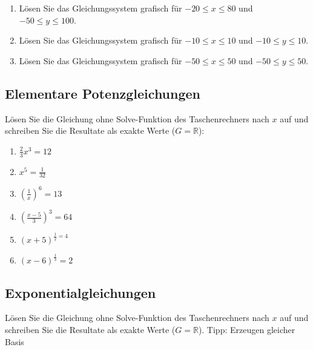   \begin{enumerate}
  \item Lösen Sie das Gleichungssystem grafisch für
    $-20 \leq x \leq 80$ und $-50 \leq y \leq 100$.


    \item Lösen Sie das Gleichungssystem grafisch für
      $-10 \leq x \leq 10$ und $-10 \leq y \leq 10$.


          \item Lösen Sie das Gleichungssystem grafisch für
      $-50 \leq x \leq 50$ und $-50 \leq y \leq 50$.


  \end{enumerate}

\subsection{Elementare Potenzgleichungen}
Lösen Sie die Gleichung ohne Solve-Funktion des Taschenrechners nach
$x$ auf und schreiben Sie die Resultate als exakte Werte ($G =
\mathbb{R}$):

\begin{multicols}{3}
\begin{enumerate}
\item $\frac{2}{3}x^3 = 12$
\item $x^5 = \frac{1}{32}$
\item $\left(\frac{1}{x}\right)^6 = 13$
\item $\left(\frac{x-5}{3}\right)^3=64$
\item $(x+5)^{\frac{1}{2} = 4}$
\item $\left(x-6\right)^{\frac{1}{3}} = 2$
\end{enumerate}
\end{multicols}




\subsection{Exponentialgleichungen}
Lösen Sie die Gleichung ohne Solve-Funktion des Taschenrechners nach
$x$ auf und schreiben Sie die Resultate als exakte Werte ($G =
\mathbb{R}$).
Tipp: Erzeugen gleicher Basis

